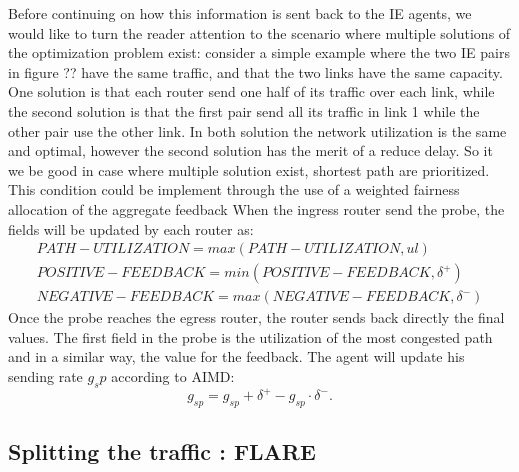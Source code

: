 Before continuing on how this information is sent back to the IE agents, we would like to turn the reader attention to the scenario where multiple solutions of the optimization problem exist: consider a simple example where the two IE pairs in figure ?? have the same traffic, and that the two links have the same capacity. One solution is that each router send one half of its traffic over each link, while the second solution is that the first pair send all its traffic in link 1 while the other pair use the other link. In both solution the network utilization is the same and optimal, however the second solution has the merit of a reduce delay. So it we be good in case where multiple solution exist, shortest path are prioritized. This condition could be implement through the use of a weighted fairness allocation of the aggregate feedback 
When the ingress router send the probe, the fields will be updated by each router as:\\
\begin{eqnarray}
PATH-UTILIZATION = max (PATH-UTILIZATION, ul ) \\
POSITIVE-FEEDBACK = min (POSITIVE-FEEDBACK, \delta^+ ) \\
NEGATIVE-FEEDBACK = max (NEGATIVE-FEEDBACK, \delta^− ) 
\end{eqnarray}
Once the probe reaches the egress router, the router sends back directly the final values. The first field in the probe is the utilization of the most congested path and in a similar way, the value for the feedback. The agent will update his sending rate $g_sp$ according to AIMD:
\begin{equation}
g_{sp} = g_{sp} + \delta^+ - g_{sp} \cdot \delta^-.
\end{equation}

\subsection{Splitting the traffic : FLARE}


